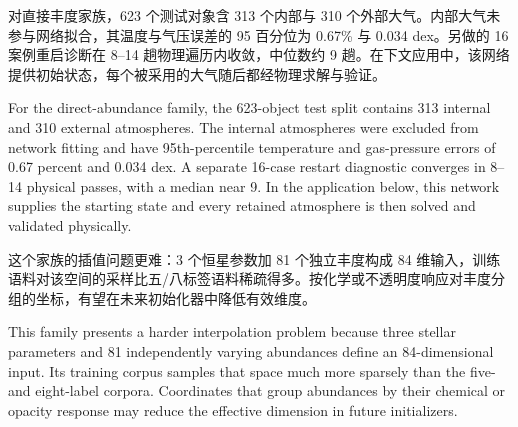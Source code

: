 对直接丰度家族，623 个测试对象含 313 个内部与 310 个外部大气。内部大气未参与网络拟合，其温度与气压误差的 95 百分位为 0.67\% 与 0.034 dex。另做的 16 案例重启诊断在 8--14 趟物理遍历内收敛，中位数约 9 趟。在下文应用中，该网络提供初始状态，每个被采用的大气随后都经物理求解与验证。

\begin{EN}
For the direct-abundance family, the 623-object test split contains 313
internal and 310 external atmospheres. The internal atmospheres were excluded
from network fitting and have 95th-percentile temperature and gas-pressure
errors of 0.67 percent and 0.034 dex. A separate 16-case restart diagnostic
converges in 8--14 physical passes, with a median near 9. In the application
below, this network supplies the starting state and every retained atmosphere
is then solved and validated physically.
\end{EN}

这个家族的插值问题更难：3 个恒星参数加 81 个独立丰度构成 84 维输入，训练语料对该空间的采样比五/八标签语料稀疏得多。按化学或不透明度响应对丰度分组的坐标，有望在未来初始化器中降低有效维度。

\begin{EN}
This family presents a harder interpolation problem because three stellar
parameters and 81 independently varying abundances define an 84-dimensional
input. Its training corpus samples that space much more sparsely than the
five- and eight-label corpora. Coordinates that group abundances by their
chemical or opacity response may reduce the effective dimension in future
initializers.
\end{EN}
